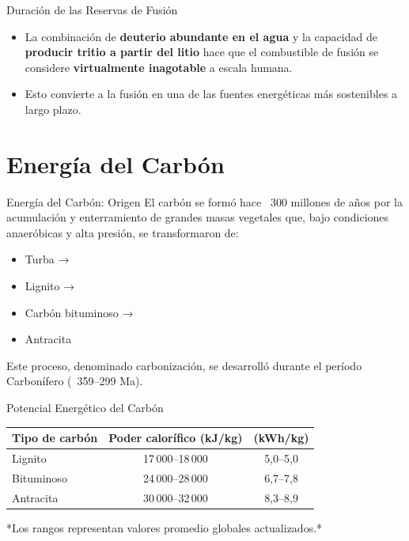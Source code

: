 \documentclass[main.tex]{subfiles}
\begin{document}
\begin{frame}{Duración de las Reservas de Fusión}
    \begin{itemize}
        \item La combinación de \textbf{deuterio abundante en el agua} y la capacidad de \textbf{producir tritio a partir del litio} hace que el combustible de fusión se considere \textbf{virtualmente inagotable} a escala humana.
        \item Esto convierte a la fusión en una de las fuentes energéticas más sostenibles a largo plazo.
    \end{itemize}
\end{frame}




\section{Energía del Carbón}
\begin{frame}{Energía del Carbón: Origen}
    El carbón se formó hace ~300 millones de años por la acumulación y enterramiento de grandes masas vegetales que, bajo condiciones anaeróbicas y alta presión, se transformaron de:
    \begin{itemize}
        \item Turba →
        \item Lignito →
        \item Carbón bituminoso →
        \item Antracita
    \end{itemize}
    Este proceso, denominado carbonización, se desarrolló durante el período Carbonífero (~359–299 Ma).
\end{frame}


\begin{frame}{Potencial Energético del Carbón}
    \begin{table}[]
        \centering
        \begin{tabular}{lcc}
            \hline
            \textbf{Tipo de carbón} & \textbf{Poder calorífico (kJ/kg)} & \textbf{(kWh/kg)} \\
            \hline
            Lignito & 17\,000–18\,000 & 5,0–5,0 \\
            Bituminoso & 24\,000–28\,000 & 6,7–7,8 \\
            Antracita & 30\,000–32\,000 & 8,3–8,9 \\
            \hline
        \end{tabular}
    \end{table}
    *Los rangos representan valores promedio globales actualizados.*
\end{frame}
\end{document}
